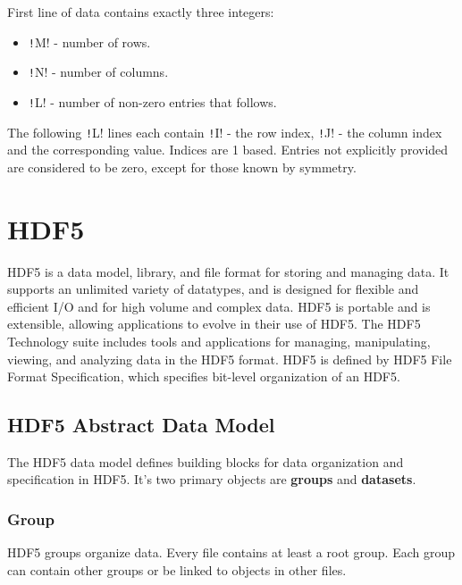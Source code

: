 \documentclass[thesis=M,english]{FITthesis}[2019/12/23]
\newcommand{\csre}[1]{\texttt!#1!}
\begin{document}
First line of data contains exactly three integers:
\begin{itemize}
    \item \csre{M} - number of rows.
    \item \csre{N} - number of columns.
    \item \csre{L} - number of non-zero entries that follows.
\end{itemize}

The following \csre{L} lines each contain \csre{I} - the row index, \csre{J} - the column index
and the corresponding value. Indices are 1 based. Entries not explicitly provided are considered
to be zero, except for those known by symmetry.


\section{HDF5}\label{theory:HDF5}

HDF5 is a data model, library, and file format for storing and managing data.
It supports an unlimited variety of datatypes, and is designed for flexible and
efficient I/O and for high volume and complex data. HDF5 is portable and is extensible,
allowing applications to evolve in their use of HDF5. The HDF5 Technology suite includes
tools and applications for managing, manipulating, viewing, and analyzing data in the HDF5 format.
\cite{hdf5} HDF5 is defined by HDF5 File Format Specification, which specifies bit-level organization of an HDF5.

\subsection{HDF5 Abstract Data Model}

The HDF5 data model defines building blocks for data organization and specification in HDF5.
It's two primary objects are \textbf{groups} and \textbf{datasets}.

\subsubsection{Group}

HDF5 groups organize data. Every file contains at least a root group.
Each group can contain other groups or be linked to objects in other files.
\end{document}
